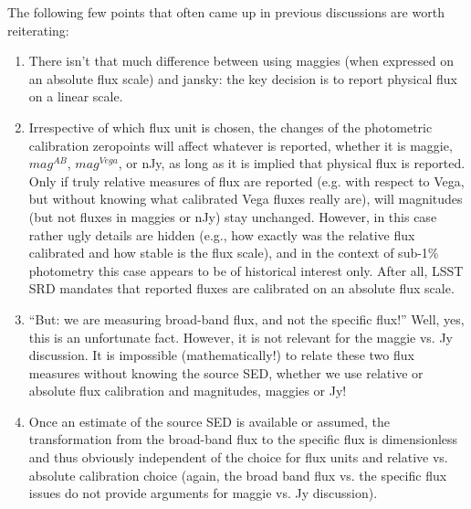 \documentclass[DM,lsstdraft,toc,usenatbib]{lsstdoc}
\begin{document}
The following few points that often came up in previous discussions are worth reiterating: 
\begin{enumerate}
\item There isn't that much difference between using maggies (when expressed on an 
absolute flux scale) and jansky: the key decision is to report physical flux on a linear scale.
\item Irrespective of which flux unit is chosen, the changes of the photometric 
calibration zeropoints will affect whatever is reported, whether it is maggie, $mag^{AB}$, 
$mag^{Vega}$, or nJy, as long as it is implied that physical flux is reported. Only if
truly relative measures of flux are reported (e.g. with respect to Vega, but without knowing 
what calibrated Vega fluxes really are), will magnitudes (but not fluxes in maggies or 
nJy) stay unchanged. However, in this case rather ugly details are hidden (e.g., how 
exactly was the relative flux calibrated and how stable is the flux scale), and in the context 
of sub-1\% photometry this case appears to be of historical interest only. After all,
LSST SRD mandates that reported fluxes are calibrated on an absolute flux scale. 
\item ``But: we are measuring broad-band flux, and not the specific flux!''  Well, 
yes, this is an unfortunate fact. However, it is not relevant for the maggie vs. Jy discussion. 
It is impossible (mathematically!) to relate these two flux measures without knowing 
the source SED, whether we use relative or absolute flux calibration and magnitudes, 
maggies or Jy! 
\item Once an estimate of the source SED is available or assumed, the transformation from
the broad-band flux to the specific flux is dimensionless and thus obviously independent 
of the choice for flux units and relative vs. absolute calibration choice (again, the broad band 
flux vs. the specific flux issues do not provide arguments for maggie vs. Jy discussion).
\end{enumerate}
\end{document}
